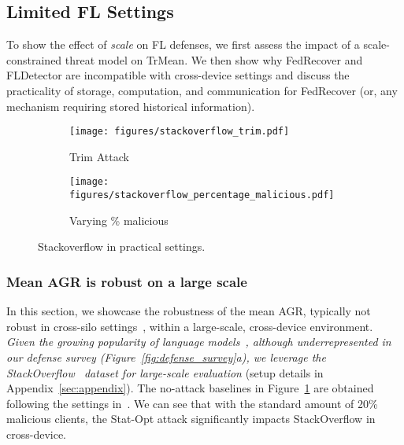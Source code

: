 \subsection{Limited FL Settings}\label{impact:scalability}
To show the effect of \emph{scale} on FL defenses, we first assess the impact of a scale-constrained threat model on TrMean. We then show why FedRecover and FLDetector are incompatible with cross-device settings and discuss the practicality of storage, computation, and communication for FedRecover (or, any mechanism requiring stored historical information).

\begin{figure}
    \centering
    \begin{subfigure}[b]{0.48\columnwidth}
        \texttt{[image: figures/stackoverflow\_trim.pdf]}
        \caption{Trim Attack}
        \label{fig:stackoverflow_trim}
    \end{subfigure}
    \begin{subfigure}[b]{0.48\columnwidth}
        \texttt{[image: figures/stackoverflow\_percentage\_malicious.pdf]}
        \caption{Varying \% malicious}
        \label{fig:stackoverflow_percentage_malicious}
    \end{subfigure}
    \caption{Stackoverflow in practical settings.}
    \label{fig:stackoverflow}
\end{figure}
\subsubsection{Mean AGR is robust on a large scale}\label{impact:scalability:stackoverflow}
In this section, we showcase the robustness of the mean AGR, typically not robust in cross-silo settings~\cite{yin2018byzantine}, within a large-scale, cross-device environment. \emph{Given the growing popularity of language models~\cite{touvron2023llama, brown2020language}, although underrepresented in our defense survey (Figure~\ref{fig:defense_survey}a), we leverage the StackOverflow~\cite{stackoverflow2019} dataset for large-scale evaluation} (setup details in Appendix~\ref{sec:appendix}). The no-attack baselines in Figure~\ref{fig:stackoverflow_trim} are obtained following the settings in~\cite{reddi2020adaptive}. We can see that with the standard amount of 20\% malicious clients, the Stat-Opt attack significantly impacts StackOverflow in cross-device.



